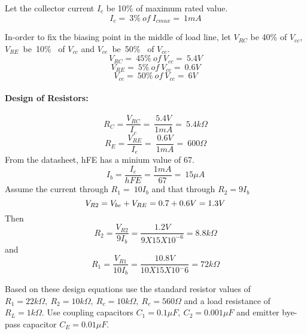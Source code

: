 \noindent Let the collector current $I_c$ be 10\% of maximum rated value.
\begin{equation}
I_{c}=\ 3\% \ of \ I_{cmax}=\ 1 mA
\end{equation}

\noindent In-order to fix the biasing point in the middle of load line, let $V_{RC}$ be 40\% of $V_{cc}$, $V_{RE}$\ be\ 10\% \ of $V_{cc}$ and $V_{ce}$\  be\ 50\% \ of $V_{cc}$.
\begin{equation}
V_{RC}=\ 45\% \ of \ V_{cc}=\ 5.4V
\end{equation}
\begin{equation}
V_{RE}=\ 5\% \ of \ V_{cc}=\ 0.6V
\end{equation}
\begin{equation}
V_{ce}=\ 50\% \ of \ V_{cc}=\ 6V
\end{equation}
\paragraph{Design of Resistors:}
\begin{equation}
R_C=\frac{V_{RC}}{I_c}=\ \frac{5.4V}{1mA}=\ 5.4 k\Omega
\end{equation}
\begin{equation}
R_E=\frac{V_{RE}}{I_e}=\ \frac{0.6V}{1mA}=\ 600\Omega
\end{equation}
\noindent From the datasheet, hFE has a minium value of 67. 
\begin{equation}
I_b=\frac{I_c}{hFE}=\frac{1mA}{67}=\ 15 \mu A
\end{equation}
\noindent Assume the current through $R_1=\ 10 I_b$ and that through $R_2=9I_b$ 
\begin{equation}
 V_{R2}=V_{be}+V_{RE}\\ =0.7+0.6V=1.3V
\end{equation}
\noindent Then
\begin{equation}
R_2=\frac{V_{R2}}{9I_b}=\frac{1.2V}{9X15X10^{-6}}=8.8 k\Omega
\end{equation}
\noindent and 
\begin{equation}
R_1=\frac{V_{R1}}{10I_b}=\frac{10.8V}{10X15X10{^-6}}= 72k\Omega
\end{equation}

\noindent Based on these design equations use the standard resistor values of $R_1=22k\Omega,\ R_2=10k\Omega, \ R_c=10k\Omega,\ R_c=560\Omega$ and a load resistance of $R_L=1k\Omega$.
Use coupling capacitors $C_1=0.1 \mu F,\ C_2=0.001\mu F$ and emitter bye-pass capacitor $C_E=0.01\mu F$.
